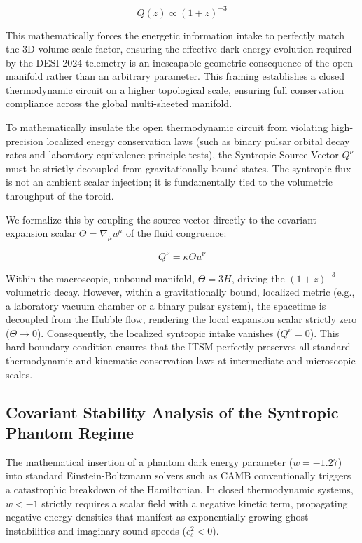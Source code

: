 \documentclass[aps,prd,10pt,twocolumn,superscriptaddress,nofootinbib,floatfix]{revtex4-2}
\begin{document}
\begin{equation} \label{eq:syntropic_decay}
Q(z) \propto (1+z)^{-3}
\end{equation}

This mathematically forces the energetic information intake to perfectly match the 3D volume scale factor, ensuring the effective dark energy evolution required by the DESI 2024 telemetry is an inescapable geometric consequence of the open manifold rather than an arbitrary parameter. This framing establishes a closed thermodynamic circuit on a higher topological scale, ensuring full conservation compliance across the global multi-sheeted manifold.

To mathematically insulate the open thermodynamic circuit from violating high-precision localized energy conservation laws (such as binary pulsar orbital decay rates and laboratory equivalence principle tests), the Syntropic Source Vector $Q^\nu$ must be strictly decoupled from gravitationally bound states. The syntropic flux is not an ambient scalar injection; it is fundamentally tied to the volumetric throughput of the toroid. 

We formalize this by coupling the source vector directly to the covariant expansion scalar $\Theta = \nabla_\mu u^\mu$ of the fluid congruence:

\begin{equation}
Q^\nu = \kappa \Theta u^\nu
\end{equation}

Within the macroscopic, unbound manifold, $\Theta = 3H$, driving the $(1+z)^{-3}$ volumetric decay. However, within a gravitationally bound, localized metric (e.g., a laboratory vacuum chamber or a binary pulsar system), the spacetime is decoupled from the Hubble flow, rendering the local expansion scalar strictly zero ($\Theta \to 0$). Consequently, the localized syntropic intake vanishes ($Q^\nu = 0$). This hard boundary condition ensures that the ITSM perfectly preserves all standard thermodynamic and kinematic conservation laws at intermediate and microscopic scales.

\subsection{Covariant Stability Analysis of the Syntropic Phantom Regime}

The mathematical insertion of a phantom dark energy parameter ($w = -1.27$) into standard Einstein-Boltzmann solvers such as CAMB conventionally triggers a catastrophic breakdown of the Hamiltonian. In closed thermodynamic systems, $w < -1$ strictly requires a scalar field with a negative kinetic term, propagating negative energy densities that manifest as exponentially growing ghost instabilities and imaginary sound speeds ($c_s^2 < 0$).
\end{document}
